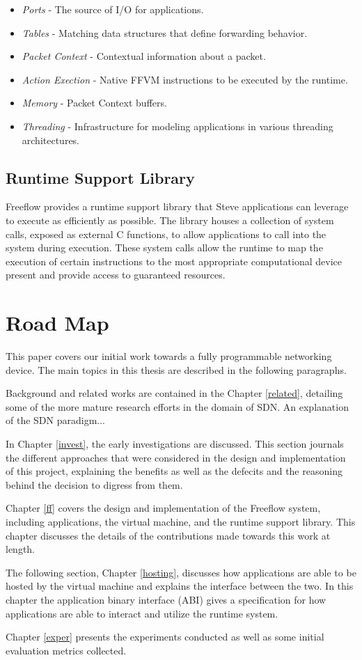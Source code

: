 \begin{itemize}
\item \emph{Ports} - The source of I/O for applications.
\item \emph{Tables} - Matching data structures that define forwarding behavior.
\item \emph{Packet Context} - Contextual information about a packet.
\item \emph{Action Exection} - Native FFVM instructions to be executed by the
runtime.
\item \emph{Memory} - Packet Context buffers.
\item \emph{Threading} - Infrastructure for modeling applications in various
threading architectures.
\end{itemize}

\subsection{Runtime Support Library}
Freeflow provides a runtime support library that Steve applications can
leverage to execute as efficiently as possible. The library houses a collection
of system calls, exposed as external C functions, to allow applications to call
into the system during execution. These system calls allow the runtime to map
the execution of certain instructions to the most appropriate computational
device present and provide access to guaranteed resources.

\section{Road Map}
This paper covers our initial work towards a fully programmable networking
device. The main topics in this thesis are described in the following paragraphs.

Background and related works are contained in the Chapter \ref{related},
detailing some of the more mature research efforts in the domain of SDN. An
explanation of the SDN paradigm...

In Chapter \ref{invest}, the early investigations are discussed. This section
journals the different approaches that were considered in the design and
implementation of this project, explaining the benefits as well as the defecits
and the reasoning behind the decision to digress from them.

Chapter \ref{ff} covers the design and implementation of the Freeflow system,
including applications, the virtual machine, and the runtime support library.
This chapter discusses the details of the contributions made towards this work
at length.

The following section, Chapter \ref{hosting}, discusses how applications are
able to be hosted by the virtual machine and explains the interface between the
two. In this chapter the application binary interface (ABI) gives a specification
for how applications are able to interact and utilize the runtime system.

Chapter \ref{exper} presents the experiments conducted as well as some initial
evaluation metrics collected.

